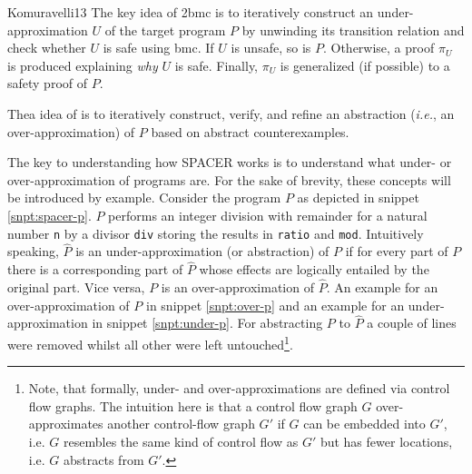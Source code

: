 \begin{displaycquote}[p.1f]{Komuravelli13}
    The key idea of \gls{2bmc} is to iteratively construct an under-approximation  $ U $ of the target program $ P $ by unwinding its transition relation and check whether $ U $ is safe using \gls{bmc}.
    If $ U $ is unsafe, so is $ P $.
    Otherwise, a proof $ \pi_U $ is produced explaining \textit{why} $ U $ is safe.
    Finally, $ \pi_U $ is generalized (if possible) to a safety proof of $ P $.
    \textelp{}

    Thea idea of  is to iteratively construct, verify, and refine an abstraction (\textit{i.e.}, an over-approximation) of $ P $ based on abstract counterexamples.
\end{displaycquote}

The key to understanding how SPACER works is to understand what under- or over-approximation of programs are.
For the sake of brevity, these concepts will be introduced by example.
Consider the program $ P $ as depicted in snippet \ref{snpt:spacer-p}.
$ P $ performs an integer division with remainder for a natural number \lstinline{n} by a divisor \lstinline{div} storing the results in \lstinline{ratio} and \lstinline{mod}.
Intuitively speaking, $ \hat{P} $ is an under-approximation (or abstraction) of $ P $ if for every part of $ P $ there is a corresponding part of $ \hat{P} $ whose effects are logically entailed by the original part.
Vice versa, $ P $ is an over-approximation of $ \hat{P} $.
An example for an over-approximation of $ P $ in snippet \ref{snpt:over-p} and an example for an under-approximation in snippet \ref{snpt:under-p}.
For abstracting $ P $ to $ \hat{P} $ a couple of lines were removed whilst all other were left untouched\footnote{%
    Note, that formally, under- and over-approximations are defined via control flow graphs.
    The intuition here is that a control flow graph $ G $ over-approximates another control-flow graph $ G' $ if $ G $ can be embedded into $ G' $, i.e. $ G $ resembles the same kind of control flow as $ G' $ but has fewer locations, i.e. $ G $ abstracts from $ G' $.
}.

